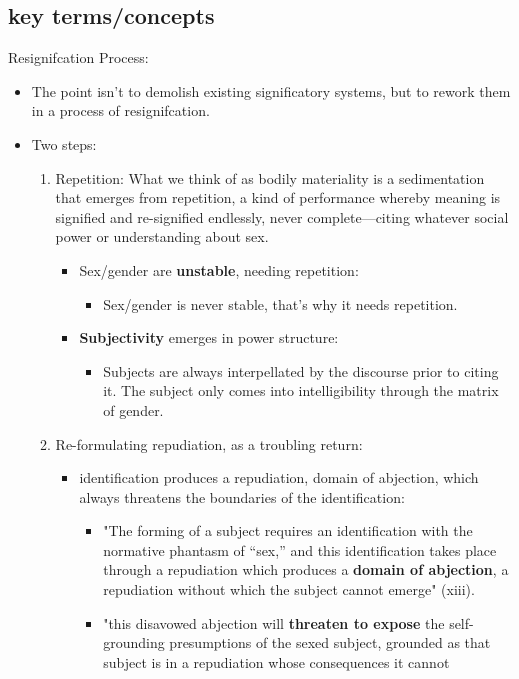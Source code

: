 \documentclass[11pt]{article}
\begin{document}
\subsection{key terms/concepts}
\label{sec:orgbe98338}
Resignifcation Process:
\begin{itemize}
\item The point isn't to demolish existing significatory systems, but to
rework them in a process of resignifcation.
\item Two steps:
\begin{enumerate}
\item Repetition: What we think of as bodily materiality is a
sedimentation that emerges from repetition, a kind of performance
whereby meaning is signified and re-signified endlessly, never
complete---citing whatever social power or understanding about
sex.
\begin{itemize}
\item Sex/gender are \textbf{unstable}, needing repetition:
\begin{itemize}
\item Sex/gender is never stable, that's why it needs repetition.
\end{itemize}
\item \textbf{Subjectivity} emerges in power structure:
\begin{itemize}
\item Subjects are always interpellated by the discourse prior to
citing it. The subject only comes into intelligibility
through the matrix of gender.
\end{itemize}
\end{itemize}
\item Re-formulating repudiation, as a troubling return:
\begin{itemize}
\item identification produces a repudiation, domain of abjection,
which always threatens the boundaries of the identification:
\begin{itemize}
\item "The forming of a subject requires an identification with the
normative phantasm of “sex,” and this identification takes
place through a repudiation which produces a \textbf{domain of
abjection}, a repudiation without which the subject cannot
emerge" (xiii).
\item "this disavowed abjection will \textbf{threaten to expose} the
self-grounding presumptions of the sexed subject, grounded as
that subject is in a repudiation whose consequences it cannot

\end{itemize}
\end{itemize}
\end{enumerate}
\end{itemize}
\end{document}
